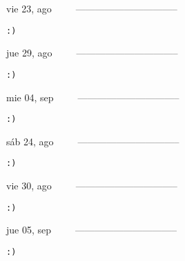 \documentclass[letterpaper,10pt]{article}
\begin{document}
\begin{multicols}{3}
{vie 23, ago\ \ \ \ \ --------------------------------}
\begin{flushright}\begin{small}\texttt{:)}\end{small}\end{flushright}
\vfill
{jue 29, ago\ \ \ \ \ --------------------------------}
\begin{flushright}\begin{small}\texttt{:)}\end{small}\end{flushright}\par
\vfill
{mie 04, sep\ \ \ \ \ --------------------------------}
\begin{flushright}\begin{small}\texttt{:)}\end{small}\end{flushright}\par
\vfill
\end{multicols}
\vspace{1.05cm}

\begin{multicols}{3}
{sáb 24, ago\ \ \ \ \ --------------------------------}
\begin{flushright}\begin{small}\texttt{:)}\end{small}\end{flushright}
\vfill
{vie 30, ago\ \ \ \ \ --------------------------------}
\begin{flushright}\begin{small}\texttt{:)}\end{small}\end{flushright}\par
\vfill
{jue 05, sep\ \ \ \ \ --------------------------------}
\begin{flushright}\begin{small}\texttt{:)}\end{small}\end{flushright}\par
\vfill
\end{multicols}
\vspace{1.05cm}
\end{document}
